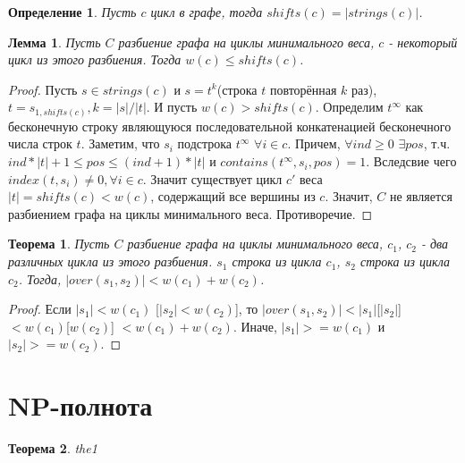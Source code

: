 \documentclass[a4paper,10pt]{article}
\newtheorem{theorem}{Теорема}
\newtheorem{lemma}{Лемма}
\newtheorem{definition}{Определение}
\begin{document}
\begin{definition}
Пусть $c$ цикл в графе, тогда $shifts(c) = |strings(c)|$.
\end{definition}

\begin{lemma}
Пусть $C$ разбиение графа на циклы минимального веса, $c$ - некоторый цикл из этого разбиения.
Тогда $w(c) \leq shifts(c)$.
\end{lemma}

\begin{proof}
Пусть $s \in strings(c)$ и $s = t^k$(строка $t$ повторённая $k$ раз), $t = s_{1, shifts(c)}, k = |s| / |t|$.
И пусть $w(c) > shifts(c)$.
Определим $t^\infty$ как бесконечную строку являющуюся последовательной конкатенацией бесконечного числа строк $t$.
Заметим, что $s_i$ подстрока $t^\infty$ $\forall i \in c$. Причем, $\forall ind \geq 0$ $\exists pos$, т.ч. $ind * |t| + 1 \leq pos \leq (ind + 1) * |t|$
и $contains(t^\infty, s_i, pos) = 1$. 
Вследсвие чего $index(t, s_i) \ne 0, \forall i \in c$. Значит существует цикл $c'$ веса $|t| = shifts(c) < w(c)$, содержащий все вершины из $c$.
Значит, $C$ не является разбиением графа на циклы минимального веса. Противоречие.
\end{proof}

\begin{theorem}
Пусть $C$ разбиение графа на циклы минимального веса, $c_1$, $c_2$ - два различных цикла из этого разбиения.
$s_1$ строка из цикла $c_1$, $s_2$ строка из цикла $c_2$. Тогда, $|over(s_1, s_2)| < w(c_1) + w(c_2)$.
\end{theorem}

\begin{proof}
Если $|s_1| < w(c_1)$ [$|s_2| < w(c_2)$], то $|over(s_1, s_2)| < |s_1|$[$|s_2|$] $< w(c_1)$[$w(c_2)$] $< w(c_1) + w(c_2)$.
Иначе, $|s_1| >= w(c_1)$ и $|s_2| >= w(c_2)$. 
\end{proof}

\section{NP-полнота}

\begin{theorem}
the1
\end{theorem}
\end{document}
